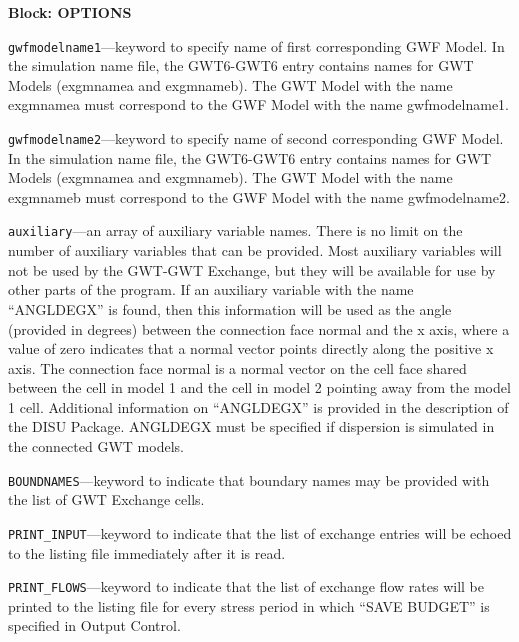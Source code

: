 
\item \textbf{Block: OPTIONS}

\begin{description}
\item \texttt{gwfmodelname1}---keyword to specify name of first corresponding GWF Model.  In the simulation name file, the GWT6-GWT6 entry contains names for GWT Models (exgmnamea and exgmnameb).  The GWT Model with the name exgmnamea must correspond to the GWF Model with the name gwfmodelname1.

\item \texttt{gwfmodelname2}---keyword to specify name of second corresponding GWF Model.  In the simulation name file, the GWT6-GWT6 entry contains names for GWT Models (exgmnamea and exgmnameb).  The GWT Model with the name exgmnameb must correspond to the GWF Model with the name gwfmodelname2.

\item \texttt{auxiliary}---an array of auxiliary variable names.  There is no limit on the number of auxiliary variables that can be provided. Most auxiliary variables will not be used by the GWT-GWT Exchange, but they will be available for use by other parts of the program.  If an auxiliary variable with the name ``ANGLDEGX'' is found, then this information will be used as the angle (provided in degrees) between the connection face normal and the x axis, where a value of zero indicates that a normal vector points directly along the positive x axis.  The connection face normal is a normal vector on the cell face shared between the cell in model 1 and the cell in model 2 pointing away from the model 1 cell.  Additional information on ``ANGLDEGX'' is provided in the description of the DISU Package.  ANGLDEGX must be specified if dispersion is simulated in the connected GWT models.

\item \texttt{BOUNDNAMES}---keyword to indicate that boundary names may be provided with the list of GWT Exchange cells.

\item \texttt{PRINT\_INPUT}---keyword to indicate that the list of exchange entries will be echoed to the listing file immediately after it is read.

\item \texttt{PRINT\_FLOWS}---keyword to indicate that the list of exchange flow rates will be printed to the listing file for every stress period in which ``SAVE BUDGET'' is specified in Output Control.


\end{description}
